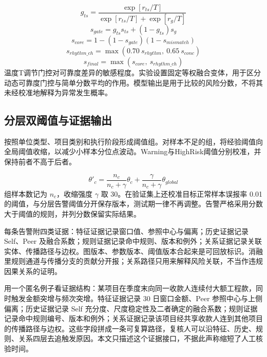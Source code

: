 \documentclass[twocolumn,11pt]{ctexart}
\begin{document}
\begin{equation}
g_{ts} = \frac{\exp[r_{ts}/T]}{\exp[r_{ts}/T] + \exp[r_{g}/T]}
\end{equation}
\begin{equation}
s_{gate} = g_{ts}s_{ts} + (1 - g_{ts})s_{g}
\end{equation}
\begin{equation}
s_{core} = 1 - (1 - s_{gate})(1 - s_{mismatch})
\end{equation}
\begin{equation}
s_{rhythm\_ch} = \max(0.70\ s_{rhythm},\ 0.65\ s_{conc})
\end{equation}
\begin{equation}
s_{final} = \max(s_{core},\ s_{rhythm\_ch})
\end{equation}
温度T调节门控对可靠度差异的敏感程度。实验设置固定等权融合变体，用于区分动态可靠度门控与简单分数平均的作用。模型输出是用于比较的风险分数，不将其未经校准地解释为异常发生概率。

\subsection{分层双阈值与证据输出}
按照单位类型、项目类别和执行阶段形成阈值组。对样本不足的组，将经验阈值向全局阈值收缩，以减少小样本分位点波动。Warning与HighRisk阈值分别校准，并保持前者不高于后者。

\begin{equation}
\theta'_{c} = \frac{n_c}{n_c + \gamma}\theta_c + \frac{\gamma}{n_c + \gamma}\theta_{global}
\end{equation}
组样本数记为 $n_c$，收缩强度 $\gamma$ 取 30。在验证集上还校准目标正常样本误报率 0.01 的阈值，与分层告警阈值分开保存版本，测试期一律不再调整。告警严格采用分数大于阈值的规则，并列分数保留实际结果。

每条告警附四类证据：特征证据记录窗口值、参照中心与偏离；历史证据记录 Self、Peer 及融合系数；规则证据记录命中规则、版本和例外；关系证据记录关联实体、传播路径与边权。图版本、参数版本、阈值版本合起来是可回放标识。消融里规则通道与传播分支的贡献分开报；关系路径只用来解释风险关联，不当作违规因果关系的证明。

用一个匿名例子看证据结构：某项目在季度末向同一收款人连续付大额工程款，同时触发金额突增与频次突增。特征证据记录 30 日窗口金额、Peer 参照中心与上侧偏离；历史证据记录 Self 充分度、尺度稳定性及二者确定的融合系数；规则证据记录命中规则编号、版本和例外；关系证据记录该项目经共享收款人连到其他项目的传播路径与边权。这些字段拼成一条可复算路径，复核人可以沿特征、历史、规则、关系四层去追触发原因。本文只描述这个证据接口，不据此声称缩短了人工核验时间。
\end{document}
